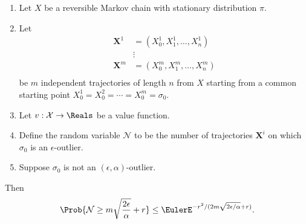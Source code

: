 \documentclass[12pt]{article}
\begin{document}
\begin{theorem}
    \label{thm:parallelsignificance:thm3point1}
    \begin{enumerate}
        \item
            Let \( X \) be a reversible Markov chain with stationary
            distribution \( \pi \).
        \item
            Let
            \begin{align*}
                \mathbf{X}^1    &= (X_0^1, X_1^1, \dots, X_n^1 )\\
                &\vdots \\
                \mathbf{X}^m    &= (X_0^m, X_1^m, \dots, X_n^m )\\
            \end{align*}
            be \( m \) independent trajectories of length \( n \) from \(
            X \) starting from a common starting point \( X_0^1 = X_0^2
            = \cdots = X_0^m = \sigma_0 \).
        \item
            Let \( v :  \mathcal{X} \to \Reals \) be a value function.
        \item
            Define the random variable \( \mathcal{N} \) to be the
            number of trajectories \( \mathbf{X}^i \) on which \( \sigma_0
            \) is an \( \epsilon \)-outlier.
        \item
            Suppose \( \sigma_0 \) is not an \( (\epsilon, \alpha) \)-outlier.
    \end{enumerate}
    Then
    \[
        \Prob{\mathcal{N} \ge m \sqrt{\frac{2\epsilon}{\alpha}} + r }
        \le \EulerE^{ -r^{2}/ (2 m\sqrt{2\epsilon/\alpha} + r)}.
    \]
\end{theorem}
\end{document}
